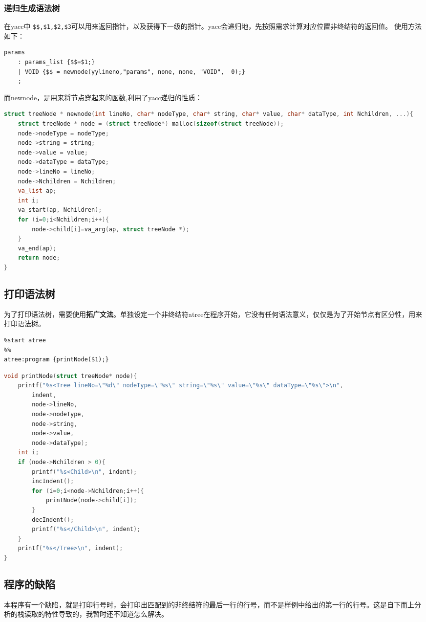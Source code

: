 \documentclass{article}
\begin{document}
\begin{CJK}{UTF8}{gkai}
\subsubsection{递归生成语法树}
在yacc中 \verb|$$,$1,$2,$3|可以用来返回指针，以及获得下一级的指针。yacc会递归地，先按照需求计算对应位置非终结符的返回值。
使用方法如下：
\begin{verbatim}
params
    : params_list {$$=$1;}
    | VOID {$$ = newnode(yylineno,"params", none, none, "VOID",  0);}
    ;
\end{verbatim}
而newnode，是用来将节点穿起来的函数,利用了yacc递归的性质：
\begin{lstlisting}[language=c]
struct treeNode * newnode(int lineNo, char* nodeType, char* string, char* value, char* dataType, int Nchildren, ...){
    struct treeNode * node = (struct treeNode*) malloc(sizeof(struct treeNode));
    node->nodeType = nodeType;
    node->string = string;
    node->value = value;
    node->dataType = dataType;
    node->lineNo = lineNo;
    node->Nchildren = Nchildren;
    va_list ap;
    int i;
    va_start(ap, Nchildren);
    for (i=0;i<Nchildren;i++){
        node->child[i]=va_arg(ap, struct treeNode *);
    }
    va_end(ap);
    return node;
}
\end{lstlisting}

\subsection{打印语法树}
为了打印语法树，需要使用\textbf{拓广文法}。单独设定一个非终结符atree在程序开始，它没有任何语法意义，仅仅是为了开始节点有区分性，用来打印语法树。
\begin{verbatim}
%start atree
%%
atree:program {printNode($1);}
\end{verbatim}
\begin{lstlisting}[language=c]
void printNode(struct treeNode* node){
    printf("%s<Tree lineNo=\"%d\" nodeType=\"%s\" string=\"%s\" value=\"%s\" dataType=\"%s\">\n", 
        indent,
        node->lineNo,
        node->nodeType,
        node->string,
        node->value, 
        node->dataType);
    int i;
    if (node->Nchildren > 0){
        printf("%s<Child>\n", indent);
        incIndent();
        for (i=0;i<node->Nchildren;i++){
            printNode(node->child[i]);
        }
        decIndent();
        printf("%s</Child>\n", indent);
    }
    printf("%s</Tree>\n", indent);
}
\end{lstlisting}
\subsection{程序的缺陷}
本程序有一个缺陷，就是打印行号时，会打印出匹配到的非终结符的最后一行的行号，而不是样例中给出的第一行的行号。这是自下而上分析的栈读取的特性导致的，我暂时还不知道怎么解决。


\end{CJK}
\end{document}
